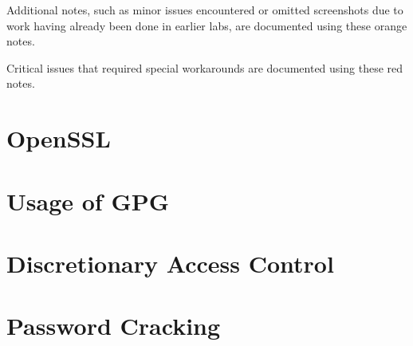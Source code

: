 \documentclass[12pt]{report}
\begin{document}
    \vspace{50pt}

    \begin{tcolorbox}[colback=orange!5!white,colframe=orange!75!black,title=Example note]
        Additional notes, such as minor issues encountered or omitted screenshots due to
        work having already been done in earlier labs, are documented using these orange notes.
    \end{tcolorbox}

    \vspace{5pt}

    \begin{tcolorbox}[colback=red!5!white,colframe=red!75!black,title=Example important note]
        Critical issues that required special workarounds are documented using these red notes.
    \end{tcolorbox}

    \vspace{5pt}



    \chapter{OpenSSL}\label{ch:lab1}
    

    \newpage

    \chapter{Usage of GPG}\label{ch:lab2}
    

    \addtocounter{chapter}{2} %
    \chapter{Discretionary Access Control}\label{ch:lab5}
    

    \chapter{Password Cracking}\label{ch:lab6}
    
\end{document}
